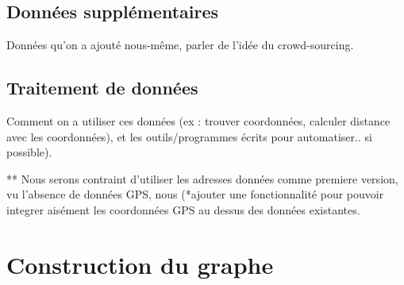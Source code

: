 	\subsection{Données supplémentaires}
	Données qu'on a ajouté nous-même, parler de l'idée du crowd-sourcing.
	\subsection{Traitement de données}
	Comment on a utiliser ces données (ex : trouver coordonnées, calculer distance avec les coordonnées), et les outils/programmes écrits pour automatiser.. si possible).
	
	** Nous serons contraint d'utiliser les adresses données comme premiere version, vu l'absence de données GPS, nous (*ajouter une fonctionnalité pour pouvoir integrer aisément les coordonnées GPS au dessus des données existantes.


	\section{Construction du graphe}
